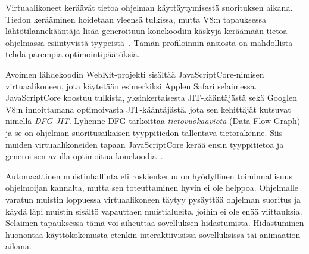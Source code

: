 Virtuaalikoneet keräävät tietoa ohjelman käyttäytymisestä suorituksen aikana. Tiedon kerääminen hoidetaan yleensä tulkissa, mutta V8:n tapauksessa lähtötilannekääntäjä lisää generoituun konekoodiin käskyjä keräämään tietoa ohjelmassa esiintyvistä tyypeistä~\cite{v8compilers}. Tämän profiloinnin ansiosta on mahdollista tehdä parempia optimointipäätöksiä.

Avoimen lähdekoodin WebKit-projekti sisältää JavaScriptCore-nimisen virtuaalikoneen, jota käytetään esimerkiksi Applen Safari selaimessa. Java\-Script\-Core koostuu tulkista, yksinkertaisesta JIT-kääntäjästä sekä Googlen V8:n innoittamana optimoivasta JIT-kääntäjästä, jota sen kehittäjät kutsuvat nimellä \textit{DFG-JIT}. Lyhenne DFG tarkoittaa \textit{tietovuokaaviota} (Data Flow Graph) ja se on ohjelman suoritusaikaisen tyyppitiedon tallentava tietorakenne. Siis muiden virtuaalikoneiden tapaan JavaScriptCore kerää ensin tyyppitietoa ja generoi sen avulla optimoitua konekoodia~\cite{javascriptcore}.

Automaattinen muistinhallinta eli roskienkeruu on hyödyllinen toiminnallisuus ohjelmoijan kannalta, mutta sen toteuttaminen hyvin ei ole helppoa. Ohjelmalle varatun muistin loppuessa virtuaalikoneen täytyy pysäyttää ohjelman suoritus ja käydä läpi muistin sisältö vapauttaen muistialueita, joihin ei ole enää viittauksia. Selaimen tapauksessa tämä voi aiheuttaa sovelluksen hidastumista. Hidastuminen huonontaa käyttökokemusta etenkin interaktiivisissa sovelluksissa tai animaation aikana.
